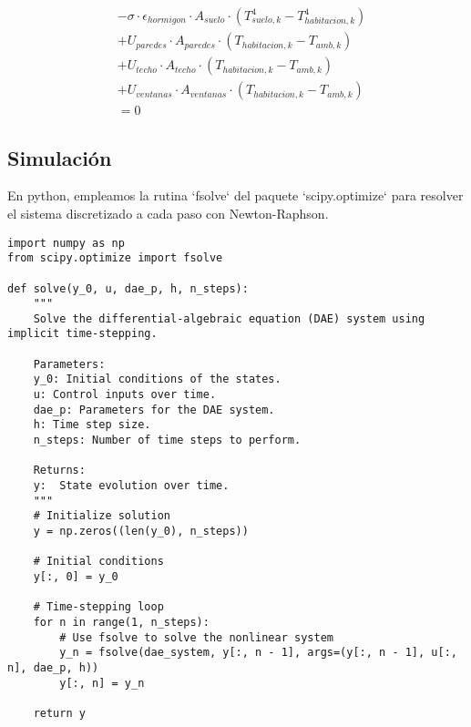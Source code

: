 \begin{align}
	                                                                                            & - \sigma \cdot \epsilon_{hormigon} \cdot A_{suelo} \cdot (T_{suelo,k}^4 - T_{habitacion,k}^4) \nonumber \\
	                                                                                            & + U_{paredes} \cdot A_{paredes} \cdot (T_{habitacion,k} - T_{amb,k}) \nonumber                          \\
	                                                                                            & + U_{techo} \cdot A_{techo} \cdot (T_{habitacion,k} - T_{amb,k}) \nonumber                              \\
	                                                                                            & + U_{ventanas} \cdot A_{ventanas} \cdot (T_{habitacion,k} - T_{amb,k}) \nonumber                        \\
	                                                                                            & = 0
\end{align}


\subsection{Simulación}


En python, empleamos la rutina `fsolve` del paquete `scipy.optimize` para
resolver el sistema discretizado a cada paso con Newton-Raphson.

\begin{verbatim}
import numpy as np
from scipy.optimize import fsolve

def solve(y_0, u, dae_p, h, n_steps):
    """
    Solve the differential-algebraic equation (DAE) system using implicit time-stepping.

    Parameters:
    y_0: Initial conditions of the states.
    u: Control inputs over time.
    dae_p: Parameters for the DAE system.
    h: Time step size.
    n_steps: Number of time steps to perform.

    Returns:
    y:  State evolution over time.
    """
    # Initialize solution
    y = np.zeros((len(y_0), n_steps))

    # Initial conditions
    y[:, 0] = y_0

    # Time-stepping loop
    for n in range(1, n_steps):
        # Use fsolve to solve the nonlinear system
        y_n = fsolve(dae_system, y[:, n - 1], args=(y[:, n - 1], u[:, n], dae_p, h))
        y[:, n] = y_n

    return y
\end{verbatim}

